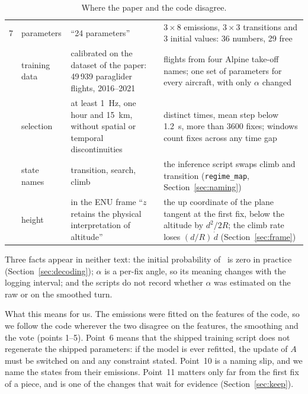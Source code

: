 \begin{table}
\begin{tabularx}{\textwidth}{@{}>{\raggedright}p{0.4cm} >{\raggedright}p{2.2cm} >{\raggedright}X >{\raggedright\arraybackslash}X@{}}
7 & parameters & ``24 parameters'' & $3\times8$ emissions, $3\times3$ transitions and 3 initial values: 36 numbers, 29 free \\ \addlinespace
8 & training data & calibrated on the dataset of the paper: 49\,939 paraglider flights, 2016--2021 & 2019 flights from four Alpine take-off names; one set of parameters for every aircraft, with only $\alpha$ changed \\ \addlinespace
9 & selection & at least 1~Hz, one hour and 15~km, without spatial or temporal discontinuities & distinct times, mean step below 1.2~s, more than 3600 fixes; windows count fixes across any time gap \\ \addlinespace
10 & state names & transition, search, climb & the inference script swaps climb and transition (\texttt{regime\_map}, Section~\ref{sec:naming}) \\ \addlinespace
11 & height & in the ENU frame ``$z$ retains the physical interpretation of altitude'' & the up coordinate of the plane tangent at the first fix, below the altitude by $d^2/2R$; the climb rate loses $(d/R)\,\dot d$ (Section~\ref{sec:frame}) \\
\bottomrule
\end{tabularx}
\caption{Where the paper and the code disagree.}
\label{tab:conflicts}
\end{table}

Three facts appear in neither text: the initial probability of \tr\ is zero in practice
(Section~\ref{sec:decoding}); $\alpha$ is a per-fix angle, so its meaning changes with the logging
interval; and the scripts do not record whether $\alpha$ was estimated on the raw or on the
smoothed turn.

\begin{keypoint}{What this means for us.}
The emissions were fitted on the features of the code, so we follow the code wherever the two
disagree on the features, the smoothing and the vote (points 1--5). Point~6 means that the shipped
training script does not regenerate the shipped parameters: if the model is ever refitted, the
update of $A$ must be switched on and any constraint stated. Point~10 is a naming slip, and we name
the states from their emissions. Point~11 matters only far from the first fix of a piece, and is
one of the changes that wait for evidence (Section~\ref{sec:keep}).
\end{keypoint}
